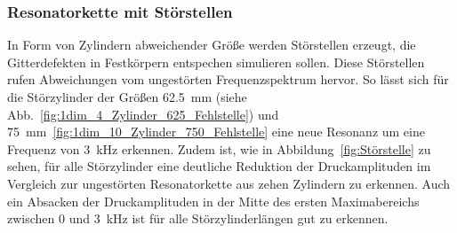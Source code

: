         \subsubsection*{Resonatorkette mit Störstellen}
            In Form von Zylindern abweichender Größe werden Störstellen erzeugt, die Gitterdefekten in Festkörpern entspechen simulieren sollen. Diese Störstellen rufen Abweichungen vom ungestörten 
            Frequenzspektrum hervor. So lässt sich für die Störzylinder der Größen \SI{62.5}{\milli\metre} (siehe Abb.~\ref{fig:1dim_4_Zylinder_625_Fehlstelle}) und 
            \SI{75}{\milli\metre}~\ref{fig:1dim_10_Zylinder_750_Fehlstelle} eine neue Resonanz um eine Frequenz von \SI{3}{\kilo\hertz} erkennen. Zudem ist, wie in Abbildung~\ref{fig:Störstelle} zu sehen, für 
            alle Störzylinder eine deutliche Reduktion der Druckamplituden im Vergleich zur ungestörten Resonatorkette aus zehen Zylindern zu erkennen. Auch ein Absacken der Druckamplituden in der Mitte des 
            ersten Maximabereichs zwischen 0 und \SI{3}{\kilo\hertz} ist für alle Störzylinderlängen gut zu erkennen.
            \FloatBarrier
